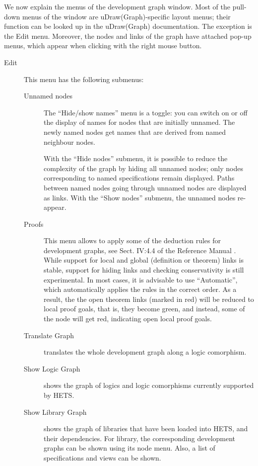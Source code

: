 \documentclass{article}
\newcommand{\normalTEXTSC}[2]{{#1\scriptsize#2}}
\newcommand     {\Hets}{\normalTEXTSC{H}{ETS}\xspace}
\begin{document}
We now explain the menus of the development graph window.
Most of the pull-down menus of the window are uDraw(Graph)-specific
layout menus;
their function can be looked up in the uDraw(Graph) documentation.
The exception is the Edit menu. Moreover, the nodes and links
of the graph have attached pop-up menus, which appear when
clicking with the right mouse button.
 
\begin{description}
\item[Edit] This menu has the following submenus:
\begin{description}
\item[Unnamed nodes] 
The ``Hide/show names'' menu is a toggle:
you can switch on or off the display of names for nodes that
are initially unnamed. The newly named nodes get names that
are derived from named neighbour nodes.

With the ``Hide nodes'' submenu, it is possible
to reduce the complexity of the graph by hiding all unnamed nodes;
only nodes corresponding to named specifications remain displayed.
Paths between named nodes going through unnamed nodes
are displayed as links. With the ``Show nodes'' submenu, the unnamed
nodes re-appear.
\item[Proofs] This menu allows to apply some of the deduction rules
  for development graphs, see Sect. IV:4.4 of the \CASL Reference
  Manual \cite{CASL/RefManual}. While support for local and global
  (definition or theorem) links is stable, support for hiding links
  and checking conservativity is still experimental. In most cases, it is
  advisable to use ``Automatic'', which automatically applies the
  rules in the correct order. As a result, the the open theorem links
  (marked in red) will be reduced to local proof goals, that is, they
  become green, and instead, some of the node will get red, indicating
  open local proof goals.

\item[Translate Graph] translates the whole development graph
along a logic comorphism.
\item[Show Logic Graph] shows the graph of logics and logic comorphisms
currently supported by \Hets.
\item[Show Library Graph] shows the graph of libraries that have
been loaded into \Hets, and their dependencies. For library,
the corresponding development graphs can be shown using its node menu.
Also, a list of specifications and views can be shown.


\end{description}
\end{description}
\end{document}
